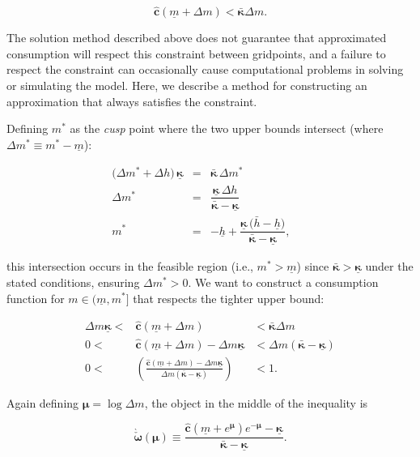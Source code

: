 \documentclass[twocolumn, switch]{article}
\newcommand{\mNrm}{m}
\newcommand{\cFunc}{\mathbf{c}}
\newcommand{\hNrm}{h}
\newcommand{\hNrmOpt}{\bar{\hNrm}}
\newcommand{\MPC}{\boldsymbol{\kappa}}
\newcommand{\MPCmin}{\underline{\MPC}}
\newcommand{\hNrmPes}{\underline{\hNrm}}
\newcommand{\mNrmMin}{\underline{\mNrm}}
\newcommand{\logmNrmEx}{\boldsymbol{\mu}}
\newcommand{\modRte}{\boldsymbol{\omega}}
\newcommand{\mNrmEx}{\Delta \mNrm}
\newcommand{\hNrmEx}{\Delta \hNrm}
\newcommand{\cFuncReal}{\hat{\cFunc}}
\newcommand{\MPCmax}{\bar{\MPC}}
\newcommand{\mNrmCusp}{\mNrm^*}
\newcommand{\mNrmCuspEx}{\Delta \mNrm^*}
\newcommand{\modRteLoTightUpBd}{\grave{\check{\modRte}}}
\begin{document}
\begin{equation}
\cFuncReal(\mNrmMin+\mNrmEx) < \MPCmax \mNrmEx.
\end{equation}

The solution method described above does not guarantee that approximated
consumption will respect this constraint between gridpoints, and a failure to
respect the constraint can occasionally cause computational problems in solving
or simulating the model. Here, we describe a method for constructing an
approximation that always satisfies the constraint.

Defining $\mNrmCusp$ as the \textit{cusp} point where the two upper bounds intersect
(where $\mNrmCuspEx\equiv\mNrmCusp -\mNrmMin$):

\begin{equation}
\label{eq:mNrmCusp}
\begin{array}{rclcll}
\bigl(\mNrmCuspEx + \hNrmEx\bigr)\,\MPCmin &= & \MPCmax\,\mNrmCuspEx & & \\
\mNrmCuspEx &= & \dfrac{\MPCmin\,\hNrmEx}{\MPCmax-\MPCmin} & & \\
\mNrmCusp &= & -\hNrmPes + \dfrac{\MPCmin\,\bigl(\hNrmOpt-\hNrmPes\bigr)}{\MPCmax-\MPCmin},
\end{array}
\end{equation}

this intersection occurs in the feasible region (i.e., $\mNrmCusp > \mNrmMin$) since $\MPCmax > \MPCmin$ under the stated conditions, ensuring $\mNrmCuspEx > 0$. We want to construct a consumption function for
$\mNrm \in (\mNrmMin, \mNrmCusp]$ that respects the tighter upper
bound:

\begin{equation}
\begin{array}{rcl}
\mNrmEx \MPCmin < & \cFuncReal(\mNrmMin+\mNrmEx) & < \MPCmax \mNrmEx \\
0 < & \cFuncReal(\mNrmMin+\mNrmEx) - \mNrmEx \MPCmin & < \mNrmEx(\MPCmax- \MPCmin) \\
0 < & \left(\frac{\cFuncReal(\mNrmMin+\mNrmEx) - \mNrmEx \MPCmin}{\mNrmEx(\MPCmax- \MPCmin)}\right) & < 1.
\end{array}
\end{equation}

Again defining $\logmNrmEx =\log \mNrmEx$, the object in the middle of
the inequality is

\begin{equation}
\label{eq:modRteLoTightUpBd}
\modRteLoTightUpBd(\logmNrmEx) \equiv  \frac{\cFuncReal(\mNrmMin+e^{\logmNrmEx})e^{-\logmNrmEx}-\MPCmin}{\MPCmax-\MPCmin}.
\end{equation}
\end{document}
